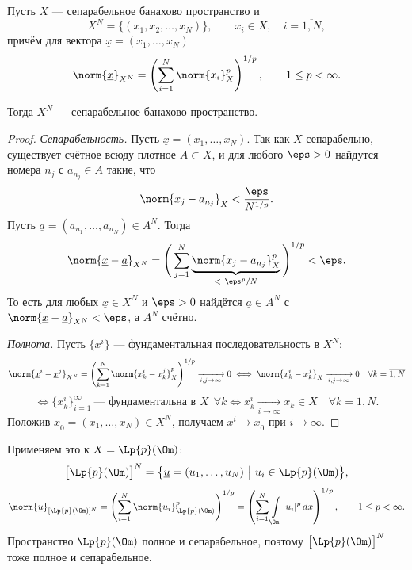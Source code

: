 Пусть $X$ — сепарабельное банахово пространство и
\[
  X^N = \{(x_1, x_2, \dots, x_N)\}, \qquad x_i \in X, \quad i = \overline{1,N} ,
\]
причём для вектора $\underline{x} = (x_1, \dots, x_N)$
\[
  \norm{\underline{x}}_{X^N} = \left( \sum_{i=1}^{N} \norm{x_i}_X^p \right)^{1/p},
  \qquad 1 \le p < \infty .
\]

\begin{proposition}\label{prop:xn}
Тогда $X^N$ — сепарабельное банахово пространство.
\end{proposition}

\begin{proof}
\emph{Сепарабельность.} Пусть $\underline{x} = (x_1, \dots, x_N)$. Так как $X$
сепарабельно, существует счётное всюду плотное $A \subset X$, и для любого $\eps > 0$
найдутся номера $n_j$ с $a_{n_j} \in A$ такие, что
\[
  \norm{x_j - a_{n_j}}_X < \frac{\eps}{N^{1/p}} .
\]
Пусть $\underline{a} = (a_{n_1}, \dots, a_{n_N}) \in A^N$. Тогда
\[
  \norm{\underline{x} - \underline{a}}_{X^N}
  = \Bigg( \sum_{j=1}^{N} \underbrace{\norm{x_j - a_{n_j}}_X^p}_{<\ \eps^p/N} \Bigg)^{1/p} < \eps .
\]
То есть для любых $\underline{x} \in X^N$ и $\eps > 0$ найдётся $\underline{a} \in A^N$
с $\norm{\underline{x} - \underline{a}}_{X^N} < \eps$, а $A^N$ счётно.

\emph{Полнота.} Пусть $\{\underline{x}^i\}$ — фундаментальная последовательность в $X^N$:
\[
  \norm{\underline{x}^i - \underline{x}^j}_{X^N}
  = \left( \sum_{k=1}^{N} \norm{x_k^i - x_k^j}_X^p \right)^{1/p}
  \xrightarrow[i,j \to \infty]{} 0
  \iff \norm{x_k^i - x_k^j}_X \xrightarrow[i,j \to \infty]{} 0 \quad \forall k = \overline{1,N}
\]
\[
  \iff \{x_k^i\}_{i=1}^{\infty} \ \text{— фундаментальна в } X \ \ \forall k
  \iff x_k^i \xrightarrow[i \to \infty]{} x_k \in X \quad \forall k = \overline{1,N} .
\]
Положив $\underline{x}_0 = (x_1, \dots, x_N) \in X^N$, получаем
$\underline{x}^i \to \underline{x}_0$ при $i \to \infty$.
\end{proof}

Применяем это к $X = \Lp{p}(\Om)$:
\[
  \big[\Lp{p}(\Om)\big]^N
  = \big\{\underline{u} = (u_1, \dots, u_N) \ \big|\ u_i \in \Lp{p}(\Om) \big\} ,
\]
\[
  \norm{\underline{u}}_{[\Lp{p}(\Om)]^N}
  = \left( \sum_{i=1}^{N} \norm{u_i}^p_{\Lp{p}(\Om)} \right)^{1/p}
  = \left( \sum_{i=1}^{N} \int\limits_\Om |u_i|^p\, dx \right)^{1/p},
  \qquad 1 \le p < \infty .
\]
Пространство $\Lp{p}(\Om)$ полное и сепарабельное, поэтому $\big[\Lp{p}(\Om)\big]^N$
тоже полное и сепарабельное.

